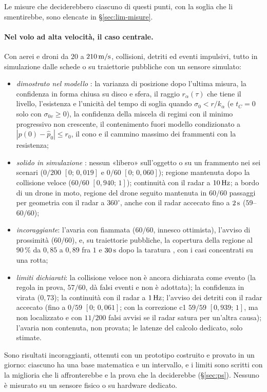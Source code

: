 Le misure che deciderebbero ciascuno di questi punti, con la soglia che li smentirebbe, sono elencate in \S\ref{sec:lim-misure}.

\paragraph{Nel volo ad alta velocità, il caso centrale.} Con aerei e droni da $20$ a $210\,\mathrm{m/s}$, collisioni, detriti ed eventi impulsivi, tutto in simulazione dalle schede o su traiettorie pubbliche con un sensore simulato:
\begin{itemize}
\item \emph{dimostrato nel modello} : la varianza di posizione dopo l'ultima misura, la confidenza in forma chiusa su disco e sfera, il raggio $r_\alpha(\tau)$ che tiene il livello, l'esistenza e l'unicità del tempo di soglia quando $\sigma_0<r/k_\alpha$ (e $t_C=0$ solo con $\sigma_{0v}\ge0$), la confidenza della miscela di regimi con il minimo progressivo non crescente, il contenimento fuori modello condizionato a $|p(0)-\hat p_0|\le r_0$, il cono e il cammino massimo dei frammenti con la resistenza;
\item \emph{solido in simulazione} : nessun «libero» sull'oggetto o su un frammento nei sei scenari ($0/200$ $[0;\,0{,}019]$ e $0/60$ $[0;\,0{,}060]$); regione mantenuta dopo la collisione veloce ($60/60$ $[0{,}940;\,1]$); continuità con il radar a $10\,\mathrm{Hz}$; a bordo di un drone in moto, regione del drone seguito mantenuta in $60/60$ passaggi per geometria con il radar a $360^\circ$, anche con il radar accecato fino a $2\,\mathrm{s}$ ($59$--$60/60$);
\item \emph{incoraggiante}: l'avaria con fiammata ($60/60$, innesco ottimista), l'avviso di prossimità ($60/60$), e, su traiettorie pubbliche, la copertura della regione al $90\,\%$ da $0{,}85$ a $0{,}89$ fra $1$ e $30\,\mathrm{s}$ dopo la taratura , con i casi concentrati su una rotta;
\item \emph{limiti dichiarati}: la collisione veloce non è ancora dichiarata come evento (la regola in prova, $57/60$, dà falsi eventi e non è adottata); la confidenza in virata ($0{,}73$); la continuità con il radar a $1\,\mathrm{Hz}$; l'avviso dei detriti con il radar accecato (fino a $0/59$ $[0;\,0{,}061]$; con la correzione c1 $59/59$ $[0{,}939;\,1]$, ma non localizzato e con $11/200$ falsi avvisi se il radar satura per un'altra causa); l'avaria non contenuta, non provata; le latenze del calcolo dedicato, solo stimate.
\end{itemize}
Sono risultati incoraggianti, ottenuti con un prototipo costruito e provato in un giorno: ciascuno ha una base matematica e un intervallo, e i limiti sono scritti con la miglioria che li affronterebbe e la prova che la deciderebbe (\S\ref{sec:ps}). Nessuno è misurato su un sensore fisico o su hardware dedicato.

